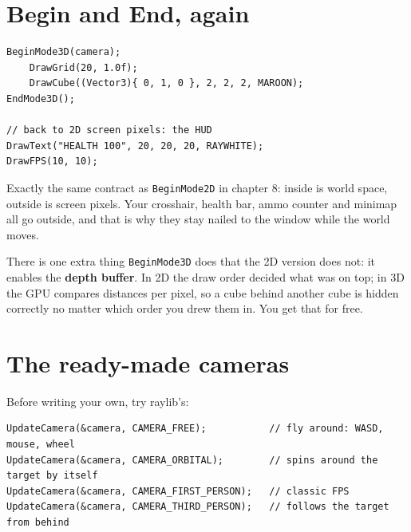 
\section{Begin and End, again}

\begin{lstlisting}
BeginMode3D(camera);
    DrawGrid(20, 1.0f);
    DrawCube((Vector3){ 0, 1, 0 }, 2, 2, 2, MAROON);
EndMode3D();

// back to 2D screen pixels: the HUD
DrawText("HEALTH 100", 20, 20, 20, RAYWHITE);
DrawFPS(10, 10);
\end{lstlisting}

Exactly the same contract as \lstinline|BeginMode2D| in chapter 8: inside is
world space, outside is screen pixels. Your crosshair, health bar, ammo counter
and minimap all go outside, and that is why they stay nailed to the window while
the world moves.

There is one extra thing \lstinline|BeginMode3D| does that the 2D version does
not: it enables the \textbf{depth buffer}. In 2D the draw order decided what was
on top; in 3D the GPU compares distances per pixel, so a cube behind another cube
is hidden correctly no matter which order you drew them in. You get that for
free.


\section{The ready-made cameras}

Before writing your own, try raylib's:

\begin{lstlisting}
UpdateCamera(&camera, CAMERA_FREE);           // fly around: WASD, mouse, wheel
UpdateCamera(&camera, CAMERA_ORBITAL);        // spins around the target by itself
UpdateCamera(&camera, CAMERA_FIRST_PERSON);   // classic FPS
UpdateCamera(&camera, CAMERA_THIRD_PERSON);   // follows the target from behind
\end{lstlisting}

